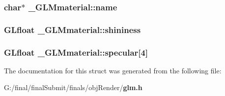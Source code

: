 \subsubsection[{name}]{\setlength{\rightskip}{0pt plus 5cm}char$\ast$ \-\_\-\-G\-L\-Mmaterial\-::name}\label{struct___g_l_mmaterial_a5aabee911354d036897d176132348601}
\subsubsection[{shininess}]{\setlength{\rightskip}{0pt plus 5cm}G\-Lfloat \-\_\-\-G\-L\-Mmaterial\-::shininess}\label{struct___g_l_mmaterial_a42623b39a8c3a06131750bca1cd83347}
\subsubsection[{specular}]{\setlength{\rightskip}{0pt plus 5cm}G\-Lfloat \-\_\-\-G\-L\-Mmaterial\-::specular[4]}\label{struct___g_l_mmaterial_a8a7847baa3892039f974d5bf4aa993be}


The documentation for this struct was generated from the following file\-:\begin{DoxyCompactItemize}
\item 
G\-:/final/final\-Submit/finals/obj\-Render/{\bf glm.\-h}\end{DoxyCompactItemize}
